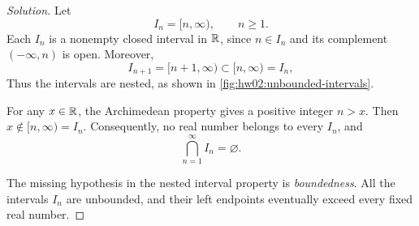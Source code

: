 
\begin{proof}[Solution]
Let
\[
  I_n=[n,\infty),\qquad n\geq1.
\]
Each $I_n$ is a nonempty closed interval in $\mathbb{R}$, since $n\in I_n$
and its complement $(-\infty,n)$ is open. Moreover,
\[
  I_{n+1}=[n+1,\infty)\subset[n,\infty)=I_n,
\]
Thus the intervals are nested, as shown in
\autoref{fig:hw02:unbounded-intervals}.

For any $x\in\mathbb{R}$, the Archimedean property gives a positive
integer $n>x$.
Then $x\notin[n,\infty)=I_n$. Consequently, no real number belongs
to every $I_n$, and
\[
  \bigcap_{n=1}^{\infty}I_n=\varnothing.
\]

\begin{marginfigure}
  \centering
  
  \caption[Nested unbounded intervals.]{Each ray $[n,\infty)$ includes its finite left endpoint
    and extends indefinitely to the right.}
  \label{fig:hw02:unbounded-intervals}
\end{marginfigure}

The missing hypothesis in the nested interval property is
\emph{boundedness}. All the intervals $I_n$ are unbounded, and
their left endpoints eventually exceed every fixed real number.
\end{proof}
